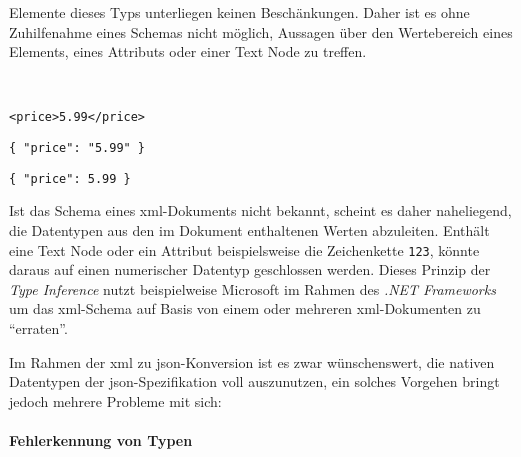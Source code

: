 Elemente dieses Typs unterliegen keinen Beschänkungen. Daher ist es ohne Zuhilfenahme eines Schemas nicht möglich, Aussagen über den Wertebereich eines Elements, eines Attributs oder einer Text Node zu treffen.

\begin{example}~

    \begin{verbatim}
<price>5.99</price>
    \end{verbatim}
    \label{fig:typeinferxml}

    \begin{verbatim}
{ "price": "5.99" }
    \end{verbatim}
    \label{fig:typeinferjson1}

    \begin{verbatim}
{ "price": 5.99 }
    \end{verbatim}
    \label{fig:typeinferjson2}

\end{example}

Ist das Schema eines \acrshort{xml}-Dokuments nicht bekannt, scheint es daher naheliegend, die Datentypen aus den im Dokument enthaltenen Werten abzuleiten. Enthält eine Text Node oder ein Attribut beispielsweise die Zeichenkette \texttt{123}, könnte daraus auf einen numerischer Datentyp geschlossen werden. Dieses Prinzip der \emph{Type Inference} nutzt beispielweise Microsoft im Rahmen des \emph{.NET Frameworks} um das \acrshort{xml}-Schema auf Basis von einem oder mehreren \acrshort{xml}-Dokumenten zu \enquote{erraten}.~\cite{msdn2017inferxmlschema}

Im Rahmen der \acrshort{xml} zu \acrshort{json}-Konversion ist es zwar wünschenswert, die nativen Datentypen der \acrshort{json}-Spezifikation voll auszunutzen, ein solches Vorgehen bringt jedoch mehrere Probleme mit sich:

\paragraph{Fehlerkennung von Typen}

